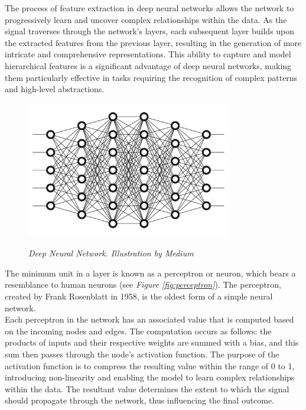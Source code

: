 The process of feature extraction in deep neural networks allows the network to
progressively learn and uncover complex relationships within the data. As the
signal traverses through the network's layers, each subsequent layer builds
upon the extracted features from the previous layer, resulting in the
generation of more intricate and comprehensive representations. This ability to
capture and model hierarchical features is a significant advantage of deep
neural networks, making them particularly effective in tasks requiring the
recognition of complex patterns and high-level abstractions.

\begin{figure}[H]
  \centering
  \includegraphics[width=0.8\textwidth]{imatges/preliminaries/deepnn.jpg}
  \caption[Deep Neural Network] {\textit{Deep Neural Network.
  Illustration by Medium}}
  {\label{fig:deep-nn}}
\end{figure}

The minimum unit in a layer is known as a perceptron or neuron, which bears a
resemblance to human neurons (see \textit{Figure \ref{fig:perceptron}}). The
perceptron, created by Frank Rosenblatt in 1958, is the oldest form of a simple
neural network. \\

Each perceptron in the network has an associated value that is computed based
on the incoming nodes and edges. The computation occurs as follows: the
products of inputs and their respective weights are summed with a bias, and
this sum then passes through the node's activation function. The purpose of the
activation function is to compress the resulting value within the range of 0 to
1, introducing non-linearity and enabling the model to learn complex
relationships within the data. The resultant value determines the extent to
which the signal should propagate through the network, thus influencing the
final outcome.


